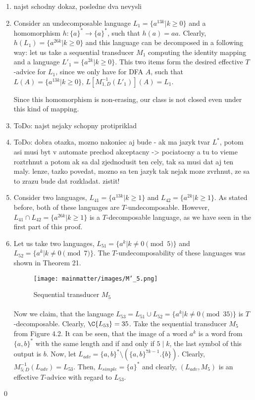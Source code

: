 \begin{enumerate}
\item \color{red}najst schodny dokaz, posledne dva nevysli\color{black}

\item Consider an undecomposable language $L_1 = \{ a^{13k} | k \geq 0 \}$ and a homomorphism $h:\{ a\}^* \to \{ a \}^*$, such that $h(a) = aa$. Clearly, $h(L_1) = \{ a^{26k} | k \geq 0 \}$ and this language can be decomposed in a following way: let us take a sequential transducer $M_1$ computing the identity mapping and a language $L'_1 = \{ a^{2k} | k \geq 0 \}$. This two items form the desired effective $T$-advice for $L_1$, since we only have for DFA $A$, such that $L(A) = \{ a^{13k} | k \geq 0 \}$, $L[M_{1,D}^{-1}(L'_1)](A) = L_1$.

Since this homomorphism is non-erasing, our class is not closed even under this kind of mapping.

\item \color{red}ToDo: najst nejaky schopny protipriklad\color{black}

\item \color{red}ToDo: dobra otazka, mozno nakoniec aj bude - ak ma jazyk  tvar $L^*$, potom asi musi byt v automate prechod akceptacny -> pociatocny a tu to vieme roztrhnut a potom ak sa dal zjednodusit ten cely, tak sa musi dat aj ten maly. lenze, tazko povedat, mozno sa ten jazyk tak nejak moze zvrhnut, ze sa to zrazu bude dat rozkladat. zistit!\color{black}

\item Consider two languages, $L_{41} = \{ a^{13k} | k \geq 1 \}$ and $L_{42} = \{ a^{2k} | k \geq 1 \}$. As stated before, both of these languages are $T$-undecomposable. However, $L_{41} \cap L_{42} = \{ a^{26k} | k \geq 1 \}$ is a $T$-decomposable language, as we have seen in the first part of this proof.

\item Let us take two languages, $L_{51} = \{ a^k | k \neq 0 \pmod{5} \}$ and $L_{52} = \{ a^k | k \neq 0 \pmod{7} \}$. The $T$-undecomposability of these languages was shown in Theorem 21.

\begin{figure}[h!]
\centering
\texttt{[image: mainmatter/images/M'\_5.png]}
\caption{Sequential transducer $M_5$}
\end{figure}

\paragraph{}
Now we claim, that the language $L_{53} = L_{51} \cup L_{52} = \{a^k|k\neq 0 \pmod{35}\}$ is $T$-decomposable. Clearly, $\C{L_{53}} = 35$. Take the sequential transducer $M_5$ from Figure 4.2. It can be seen, that the image of a word $a^{k}$ is a word from $\{a,b\}^*$ with the same length and if and only if $5 \mid k$, the last symbol of this output is $b$. Now, let $L_{adv} = \{a,b\}^* \setminus  (\{a,b\}^{7k-1}.\{b\})$. Clearly, $M_{5;D}^{-1}(L_{adv}) = L_{53}$. Then, $L_{simple} = \{a\}^*$ and clearly, $(L_{adv},M_5)$ is an effective $T$-advice with regard to $L_{53}$.

\end{enumerate} \qed

